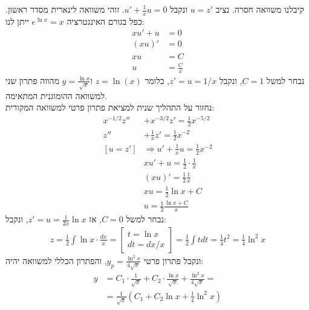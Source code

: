\documentclass{article}
\begin{document}
קיבלנו משוואה חסרה.
נציב $u=z'$ ונקבל $u'+\frac{1}{x}u=0$.
זוהי משוואה לינארית מסדר ראשון. כפל בגורם האינגטרציה $e^{\ln x}=x$ ייתן לנו:
\begin{align*}
    xu'+u & =0            \\
    (xu)' & =0            \\
    xu    & = C           \\
    u     & = \frac{C}{x}
\end{align*}
נבחר למשל $C=1$, ונקבל $z'=u=1/x$, כלומר $z=\ln(x)$ ו$y=\frac{\ln x}{\sqrt{x}}$ מהווה פתרון שני למשוואה ההומוגנית המתאימה.\\
נחזור על התהליך שנית למציאת פתרון פרטי למשוואה המקורית:
\begin{align*}
    x^{-1/2}z'' & +x^{-3/2}z'=\frac{1}{2}x^{-5/2}               \\
    z''         & + \frac{1}{x}z'=\frac{1}{2}x^{-2}             \\
    [u=z']      & \Rightarrow u'+\frac{1}{x}u=\frac{1}{2}x^{-2} \\
                & xu'+u=\frac{1}{2}\cdot \frac{1}{x}            \\
                & (xu)'=\frac{1}{2}\frac{1}{x}                  \\
                & xu = \frac{1}{2}\ln x + C                     \\
                & u = \frac{1}{2}\frac{\ln x+C}{x}
\end{align*}
נבחר למשל $C=0$, אז $z'=u=\frac{1}{2x}\ln x$, ונקבל:
\begin{align*}
    z = \frac{1}{2}\int \ln x \cdot \frac{dx}{x} = \begin{bmatrix}
                                                       t = \ln x \\
                                                       dt = dx/x
                                                   \end{bmatrix} = \frac{1}{2}\int t dt = \frac{1}{4}t^2=\frac{1}{4} \ln^2 x
\end{align*}
ונקבל פתרון פרטי $y_p=\frac{\ln^2x}{4\sqrt{x}}$, והפתרון הכללי למשוואה יהיה:
\begin{align*}
    y & =C_1\cdot \frac{1}{\sqrt{x}}+C_2 \cdot \frac{\ln x}{\sqrt{x}} + \frac{\ln^2x}{4\sqrt{x}} = \\
      & = \frac{1}{\sqrt{x}}(C_1 + C_2 \ln x + \frac{1}{4}\ln^2x)
\end{align*}

\pagebreak
\end{document}
